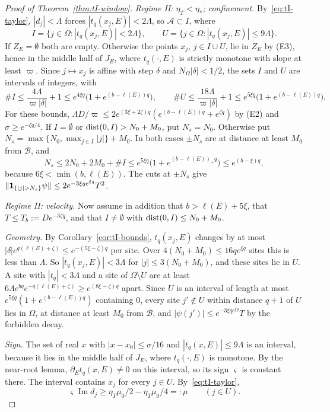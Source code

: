 \begin{proof}[Proof of Theorem~\ref{thm:tI-window}]
\emph{Regime II: $\eta_T<\eta_*$; confinement.} By~\eqref{eq:tI-taylor}, $|d_j|<\Lambda$ forces $|t_q(x_j,E)|<2\Lambda$, so $\mathcal A\subset I$, where
\[
I=\{j\in\Omega:|t_q(x_j,E)|<2\Lambda\},\qquad U=\{j\in\Omega:|t_q(x_j,E)|\le9\Lambda\}.
\]
If $Z_E=\emptyset$ both are empty. Otherwise the points $x_j$, $j\in I\cup U$, lie in $Z_E$ by (E3), hence in the middle half of $J_E$, where $t_q(\cdot,E)$ is strictly monotone with slope at least $\varpi$. Since $j\mapsto x_j$ is affine with step $\delta$ and $N_\Omega|\delta|<1/2$, the sets $I$ and $U$ are intervals of integers, with
\[
\#I\le\frac{4\Lambda}{\varpi|\delta|}+1\le e^{4\xi q}\bigl(1+e^{(b-\ell(E))q}\bigr),\qquad\#U\le\frac{18\Lambda}{\varpi|\delta|}+1\le e^{5\xi q}\bigl(1+e^{(b-\ell(E))q}\bigr).
\]
For these bounds, $\Lambda D/\varpi\le2e^{(3\xi+2\zeta)q}(e^{(b-\ell(E))q}+e^{\zeta q})$ by (E2) and $\sigma\ge e^{-\zeta q/4}$. If $I=\emptyset$ or $\operatorname{dist}(0,I)>N_0+M_0$, put $N_s=N_0$. Otherwise put $N_s=\max\{N_0,\max_{j\in I}|j|\}+M_0$. In both cases $\pm N_s$ are at distance at least $M_0$ from $\mathcal B$, and
\[
N_s\le2N_0+2M_0+\#I\le e^{5\xi q}\bigl(1+e^{(b-\ell(E))_+q}\bigr)\le e^{(b-\xi)q},
\]
because $6\xi<\min(b,\ell(E))$. The cuts at $\pm N_s$ give $\|\un_{\{|j|>N_s\}}\psi\|\le2e^{-3\xi qe^{\xi q}}T^2$.

\emph{Regime II: velocity.} Now assume in addition that $b>\ell(E)+5\xi$, that $T\le T_b:=De^{-3\zeta q}$, and that $I\ne\emptyset$ with $\operatorname{dist}(0,I)\le N_0+M_0$.

\emph{Geometry.} By Corollary~\ref{cor:tI-bounds}, $t_q(x_j,E)$ changes by at most $|\delta|e^{q(\ell(E)+\zeta)}\le e^{-(5\xi-\zeta)q}$ per site. Over $4(N_0+M_0)\le16qe^{\xi q}$ sites this is less than $\Lambda$. So $|t_q(x_j,E)|<3\Lambda$ for $|j|\le3(N_0+M_0)$, and these sites lie in $U$. A site with $|t_q|<3\Lambda$ and a site of $\Omega\setminus U$ are at least $6\Lambda e^{bq}e^{-q(\ell(E)+\zeta)}\ge e^{(8\xi-\zeta)q}$ apart. Since $U$ is an interval of length at most $e^{5\xi q}(1+e^{(b-\ell(E))q})$ containing $0$, every site $j'\notin U$ within distance $q+1$ of $U$ lies in $\Omega$, at distance at least $M_0$ from $\mathcal B$, and $|\psi(j')|\le e^{-3\xi qe^{\xi q}}T$ by the forbidden decay.

\emph{Sign.} The set of real $x$ with $|x-x_0|\le\sigma/16$ and $|t_q(x,E)|\le9\Lambda$ is an interval, because it lies in the middle half of $J_E$, where $t_q(\cdot,E)$ is monotone. By the near-root lemma, $\partial_Et_q(x,E)\ne0$ on this interval, so its sign $\varsigma$ is constant there. The interval contains $x_j$ for every $j\in U$. By~\eqref{eq:tI-taylor},
\[
\varsigma\operatorname{Im}d_j\ge\eta_T\mu_0/2-\eta_T\mu_0/4=:\mu\qquad(j\in U).
\]


\end{proof}

